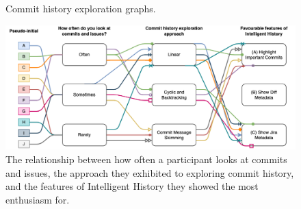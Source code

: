 \begin{figure}
  \centering%
  \qquad
  \caption{
    Commit history exploration graphs.
  }%
  \label{fig:Exploration-Graphs}%
\end{figure}

\begin{figure}
  \includegraphics[width=14cm]{./images/flow-chart.png}
  \caption{
    The relationship between how often a participant looks at commits and issues, the approach they exhibited to exploring commit history, and the features of Intelligent History they showed the most enthusiasm for.
  }
  \label{fig:Results-Qualitative}
\end{figure}

